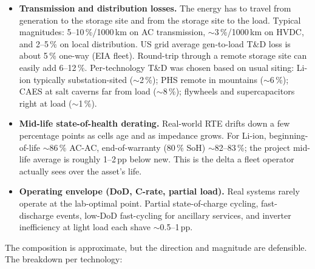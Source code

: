 \begin{itemize}
    \item \textbf{Transmission and distribution losses.} The energy
    has to travel from generation to the storage site and from the
    storage site to the load. Typical magnitudes: 5--10\,\%/1000\,km
    on AC transmission, $\sim$3\,\%/1000\,km on HVDC, and 2--5\,\%
    on local distribution. US grid average gen-to-load T\&D loss is
    about 5\,\% one-way (EIA fleet). Round-trip through a remote
    storage site can easily add 6--12\,\%. Per-technology T\&D was
    chosen based on usual siting: Li-ion typically substation-sited
    ($\sim$2\,\%); PHS remote in mountains ($\sim$6\,\%); CAES at
    salt caverns far from load ($\sim$8\,\%); flywheels and
    supercapacitors right at load ($\sim$1\,\%).
    \item \textbf{Mid-life state-of-health derating.} Real-world
    RTE drifts down a few percentage points as cells age and as
    impedance grows. For Li-ion, beginning-of-life $\sim$86\,\%
    AC-AC, end-of-warranty (80\,\% SoH) $\sim$82--83\,\%; the project
    mid-life average is roughly 1--2\,pp below new. This is the
    delta a fleet operator actually sees over the asset's life.
    \item \textbf{Operating envelope (DoD, C-rate, partial load).}
    Real systems rarely operate at the lab-optimal point. Partial
    state-of-charge cycling, fast-discharge events, low-DoD
    fast-cycling for ancillary services, and inverter
    inefficiency at light load each shave $\sim$0.5--1\,pp.
\end{itemize}

The composition is approximate, but the direction and magnitude are
defensible. The breakdown per technology:

